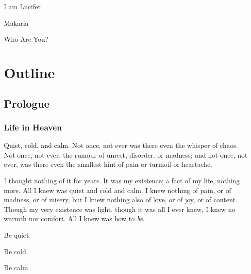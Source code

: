 \documentclass[fontsize=11pt,paper=a5,pagesize=auto]{scrbook}
\begin{document}
\begin{titlepage}
    \vspace*{1cm}
    {\Huge\center I am Lucifer\par}
    {\LARGE\center Makaria\par}
    \vfill
    {\Large\center Who Are You?\par}
\end{titlepage}
\tableofcontents

\part{Outline}
\chapter{Prologue}
\section{Life in Heaven}

Quiet, cold, and calm. Not once, not ever was there even the whisper of chaos. Not once, not ever, the rumour of unrest, disorder, or madness; and not once, not ever, was there even the smallest hint of pain or turmoil or heartache.\par
I thought nothing of it for years. It was my existence; a fact of my life, nothing more. All I knew was quiet and cold and calm. I knew nothing of pain, or of madness, or of misery, but I knew nothing also of love, or of joy, or of content. Though my very existence was light, though it was all I ever knew, I knew no warmth nor comfort. All I knew was how to \textit{be}. \par
Be quiet.

Be cold.

Be calm.
\end{document}
